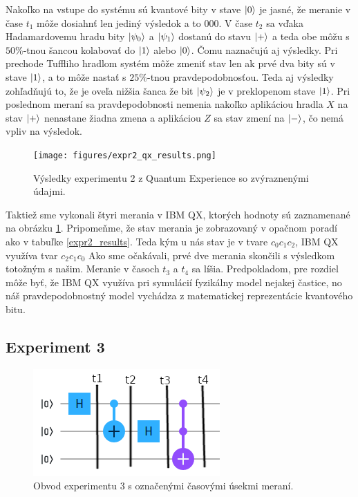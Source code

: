 Nakoľko na vstupe do systému sú kvantové bity v stave \(\ket{0}\) je jasné, že
meranie v čase \(t_1\) môže dosiahnť len jediný výsledok a to  \(000\).
V čase \(t_2\) sa vďaka Hadamardovemu hradu bity \(\ket{\psi_0}\) a 
\(\ket{\psi_1}\) dostanú do stavu \(\ket{+}\) a teda obe môžu s \(50\%\)-tnou
šancou kolabovať do \(\ket{1}\) alebo \(\ket{0}\). Čomu naznačujú aj výsledky.
Pri prechode Tuffliho hradlom systém môže zmeniť stav len ak prvé dva bity sú 
v stave \(\ket{1}\), a to môže nastať s \(25\%\)-tnou pravdepodobnosťou. Teda
aj výsledky zohľadňujú to, že je oveľa nižšia šanca že bit \(\ket{\psi_2}\)
je v preklopenom stave \(\ket{1}\). Pri poslednom meraní sa pravdepodobnosti
nemenia nakoľko aplikáciou hradla \(X\) na stav \(\ket{+}\) nenastane žiadna
zmena a aplikáciou \(Z\) sa stav zmení na \(\ket{-}\), čo nemá vpliv na
výsledok.

\begin{figure} 
	\centering 
	\texttt{[image: figures/expr2\_qx\_results.png]} 
	\caption{Výsledky experimentu 2 z Quantum Experience so zvýraznenými 
údajmi.}

    \label{expr2_qx_results}
\end{figure}

Taktiež sme vykonali štyri merania v IBM QX, ktorých hodnoty sú zaznamenané
na obrázku \ref{expr2_qx_results}. Pripomeňme, že stav merania je zobrazovaný
v opačnom poradí ako v tabuľke \ref{expr2_results}. Teda kým u nás stav je 
v tvare \(c_0c_1c_2\), IBM QX využíva tvar \(c_2c_1c_0\) Ako sme očakávali, 
prvé dve merania skončili s výsledkom totožným s našim. Meranie v časoch 
\(t_3\) a \(t_4\) sa líšia. Predpokladom, pre rozdiel môže byť, že IBM QX 
využíva pri symulácií fyzikálny model nejakej častice, no náš pravdepodobnostný
model vychádza z matematickej reprezentácie kvantového bitu.

\subsection{Experiment 3}

\begin{figure} 
	\centering 
	\includegraphics[width=.6\textwidth]{figures/expr3_circuit.png} 
	\caption{Obvod experimentu 3 s označenými časovými úsekmi meraní.}
    \label{expr3_circuit}
\end{figure}

